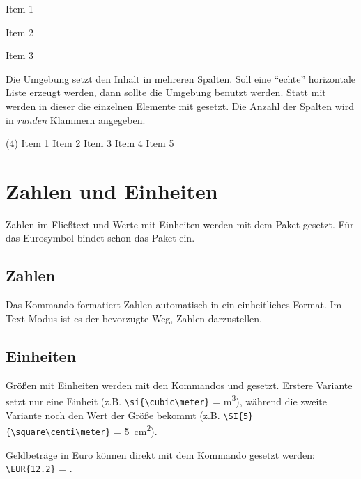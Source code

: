 \begin{example}
	\begin{multicols}{3}
		\begin{enumeraten}
			\item Item 1
			\item Item 2
			\item Item 3
		\end{enumeraten}
	\end{multicols}
\end{example}

Die Umgebung  setzt den Inhalt in mehreren Spalten. Soll eine \enquote{echte} horizontale Liste erzeugt werden, dann sollte die Umgebung  benutzt werden. Statt mit  werden in dieser die einzelnen Elemente mit  gesetzt. Die Anzahl der Spalten wird in \emph{runden} Klammern angegeben. 

\begin{example}
	\begin{tasks}(4)
		\task Item 1
		\task Item 2
		\task Item 3
		\task Item 4
		\task Item 5
	\end{tasks}
\end{example}

\section{Zahlen und Einheiten}\label{sec:zahlen}
Zahlen im Fließtext und Werte mit Einheiten werden mit dem Paket  gesetzt. Für das Eurosymbol bindet  schon das Paket  ein.

\subsection{Zahlen}
Das Kommando  formatiert Zahlen automatisch in ein einheitliches Format. Im Text-Modus ist es der bevorzugte Weg, Zahlen darzustellen.

\subsection{Einheiten}
Größen mit Einheiten werden mit den Kommandos  und  gesetzt. Erstere Variante setzt nur eine Einheit (z.B. \verb!\si{\cubic\meter}! = \si{\cubic\meter}), während die zweite Variante noch den Wert der Größe bekommt (z.B. \verb!\SI{5}{\square\centi\meter}! = \SI{5}{\square\centi\meter}).

Geldbeträge in Euro können direkt mit dem Kommando  gesetzt werden: \verb!\EUR{12.2}! = .

